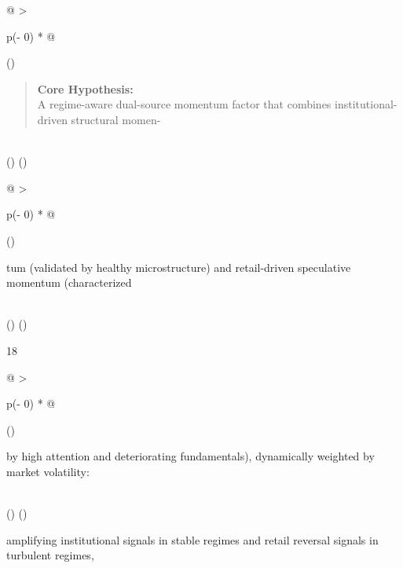 \documentclass[
]{article}
\begin{document}
\begin{longtable}[]{@{}
  >{\raggedright\arraybackslash}p{(\columnwidth - 0\tabcolsep) * }@{}}
\toprule()
\begin{minipage}[b]{\linewidth}\raggedright
\begin{quote}
\textbf{Core Hypothesis:}\\
A regime-aware dual-source momentum factor that combines
institutional-driven structural momen-
\end{quote}\strut
\end{minipage} \\
\midrule()
\endhead
\bottomrule()
\end{longtable}

\begin{longtable}[]{@{}
  >{\raggedright\arraybackslash}p{(\columnwidth - 0\tabcolsep) * }@{}}
\toprule()
\begin{minipage}[b]{\linewidth}\raggedright
tum (validated by healthy microstructure) and retail-driven speculative
momentum (characterized
\end{minipage} \\
\midrule()
\endhead
\bottomrule()
\end{longtable}

18

\begin{longtable}[]{@{}
  >{\raggedright\arraybackslash}p{(\columnwidth - 0\tabcolsep) * }@{}}
\toprule()
\begin{minipage}[b]{\linewidth}\raggedright
by high attention and deteriorating fundamentals), dynamically weighted
by market volatility:
\end{minipage} \\
\midrule()
\endhead
\bottomrule()
\end{longtable}

amplifying institutional signals in stable regimes and retail reversal
signals in turbulent regimes,
\end{document}
